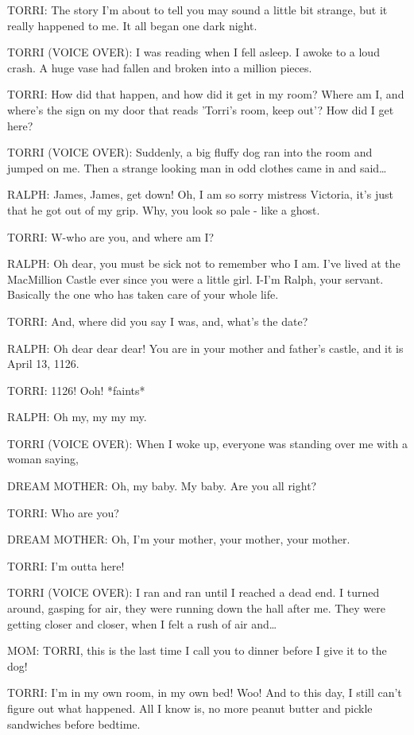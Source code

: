 TORRI:
The story I'm about to tell you may sound a little bit strange, but it really happened to me.
It all began one dark night.

TORRI (VOICE OVER):
I was reading when I fell asleep.
I awoke to a loud crash.
A huge vase had fallen and broken into a million pieces.

TORRI:
How did that happen, and how did it get in my room?
Where am I, and where's the sign on my door that reads 'Torri's room, keep out'?
How did I get here?

TORRI (VOICE OVER):
Suddenly, a big fluffy dog ran into the room and jumped on me.
Then a strange looking man in odd clothes came in and said\dots

RALPH:
James, James, get down!
Oh, I am so sorry mistress Victoria, it's just that he got out of my grip.
Why, you look so pale - like a ghost.

TORRI:
W-who are you, and where am I?

RALPH:
Oh dear, you must be sick not to remember who I am.
I've lived at the MacMillion Castle ever since you were a little girl.
I-I'm Ralph, your servant.
Basically the one who has taken care of your whole life.

TORRI:
And, where did you say I was, and, what's the date?

RALPH:
Oh dear dear dear!
You are in your mother and father's castle, and it is April 13, 1126.

TORRI:
1126!
Ooh!
*faints*

RALPH:
Oh my, my my my.

TORRI (VOICE OVER):
When I woke up, everyone was standing over me with a woman saying,

DREAM MOTHER:
Oh, my baby.
My baby.
Are you all right?

TORRI:
Who are you?

DREAM MOTHER:
Oh, I'm your mother, your mother, your mother.

TORRI:
I'm outta here!

TORRI (VOICE OVER):
I ran and ran until I reached a dead end.
I turned around, gasping for air, they were running down the hall after me.
They were getting closer and closer, when I felt a rush of air and\dots

MOM:
TORRI, this is the last time I call you to dinner before I give it to the dog!

TORRI:
I'm in my own room, in my own bed!
Woo!
And to this day, I still can't figure out what happened.
All I know is, no more peanut butter and pickle sandwiches before bedtime.

